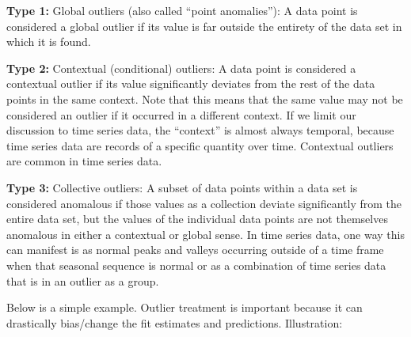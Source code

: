 \documentclass[]{book}
\theoremstyle{definition}
\theoremstyle{definition}
\theoremstyle{definition}
\theoremstyle{remark}
\begin{document}
\textbf{Type 1:} Global outliers (also called ``point anomalies''): A
data point is considered a global outlier if its value is far outside
the entirety of the data set in which it is found.

\textbf{Type 2:} Contextual (conditional) outliers: A data point is
considered a contextual outlier if its value significantly deviates from
the rest of the data points in the same context. Note that this means
that the same value may not be considered an outlier if it occurred in a
different context. If we limit our discussion to time series data, the
``context'' is almost always temporal, because time series data are
records of a specific quantity over time. Contextual outliers are common
in time series data.

\textbf{Type 3:} Collective outliers: A subset of data points within a
data set is considered anomalous if those values as a collection deviate
significantly from the entire data set, but the values of the individual
data points are not themselves anomalous in either a contextual or
global sense. In time series data, one way this can manifest is as
normal peaks and valleys occurring outside of a time frame when that
seasonal sequence is normal or as a combination of time series data that
is in an outlier as a group.

Below is a simple example. Outlier treatment is important because it can
drastically bias/change the fit estimates and predictions. Illustration:
\end{document}
